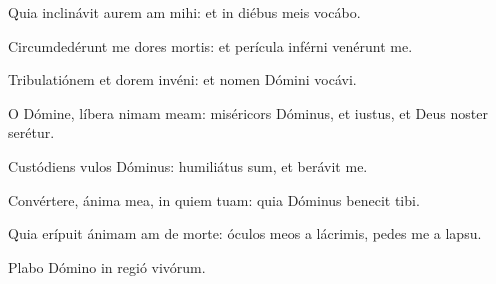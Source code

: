 \item {}

\item Quia inclinávit aurem am mihi:\psstar{} et in diébus meis vocábo.

\item Circumdedérunt me dores mortis:\psstar{} et perícula inférni venérunt me.

\item Tribulatiónem et dorem invéni:\psstar{} et nomen Dómini vocávi.

\item O Dómine, líbera nimam meam:\psstar{} miséricors Dóminus, et iustus, et Deus noster serétur.

\item Custódiens vulos Dóminus:\psstar{} humiliátus sum, et berávit me.

\item Convértere, ánima mea, in quiem tuam:\psstar{} quia Dóminus benecit tibi.

\item Quia erípuit ánimam am de morte:\psstar{} óculos meos a lácrimis, pedes me a lapsu.

\item Plabo Dómino\psstar{} in regió vivórum.
